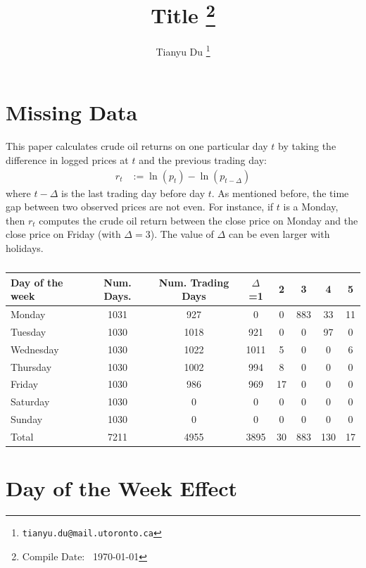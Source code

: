 \documentclass[12pt]{article}
\title{Title \footnote{Compile Date: \currenttime\ \today}}
\author{Tianyu Du \footnote{\texttt{tianyu.du@mail.utoronto.ca}}}
\begin{document}
	\maketitle
	\tableofcontents
	\newpage

	\section{Missing Data}
	\paragraph{} This paper calculates crude oil returns on one particular day $t$ by taking the difference in logged prices at $t$ and the previous trading day:
	\begin{align}
		r_t &:= \ln(p_t) - \ln(p_{t - \Delta})
	\end{align}
	where $t - \Delta$ is the last trading day before day $t$. As mentioned before, the time gap between two observed prices are not even. For instance, if $t$ is a Monday, then $r_t$ computes the crude oil return between the close price on Monday and the close price on Friday (with $\Delta = 3$). The value of $\Delta$ can be even larger with holidays.

	\begin{table}
		\center
		\begin{tabular}{|l|c c c c c c c|}
			\hline
			Day of the week & Num. Days. & Num. Trading Days & $\Delta$=1 & 2 & 3 & 4 & 5 \\
			\hline
			Monday & 1031 & 927 & 0 & 0 & 883 & 33 & 11 \\
			Tuesday & 1030 & 1018 & 921 & 0 & 0 & 97 & 0 \\
			Wednesday & 1030 & 1022 & 1011 & 5 & 0 & 0 & 6 \\
			Thursday & 1030 & 1002 & 994 & 8 & 0 & 0 & 0 \\
			Friday & 1030 & 986 & 969 & 17 & 0 & 0 & 0 \\
			Saturday & 1030 & 0 & 0 & 0 & 0 & 0 & 0 \\
			Sunday & 1030 & 0 & 0 & 0 & 0 & 0 & 0 \\
			\hline
			Total & 7211 & 4955 & 3895 & 30 & 883 & 130 & 17 \\
			\hline
		\end{tabular}
		\caption{}
	\end{table}
 
	\section{Day of the Week Effect}
\end{document}
